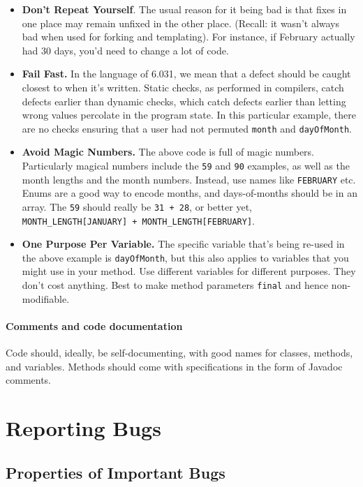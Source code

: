 \documentclass[11pt]{article}
\begin{document}
\begin{itemize}
\item {\bf Don't Repeat Yourself}. The usual reason for it
  being bad is that fixes in one place may remain unfixed in the other place. (Recall: it wasn't
  always bad when used for forking and templating). For instance, if February actually had 30
  days, you'd need to change a lot of code.
\item {\bf Fail Fast.} In the language of 6.031, we mean that a defect should be caught
  closest to when it's written. Static checks, as performed in compilers, catch defects
  earlier than dynamic checks, which catch defects earlier than letting wrong values percolate
  in the program state. In this particular example, there are no checks ensuring that a
  user had not permuted {\tt month} and {\tt dayOfMonth}.
\item {\bf Avoid Magic Numbers.} The above code is full of magic numbers. Particularly
  magical numbers include the {\tt 59} and {\tt 90} examples, as well as the month lengths
  and the month numbers. Instead, use names like {\tt FEBRUARY} etc. Enums are a good way
  to encode months, and days-of-months should be in an array. The {\tt 59} should really be
  {\tt 31 + 28}, or better yet, \verb!MONTH_LENGTH[JANUARY] + MONTH_LENGTH[FEBRUARY]!.
\item {\bf One Purpose Per Variable.} The specific variable that's
  being re-used in the above example is {\tt dayOfMonth}, but this
  also applies to variables that you might use in your method. Use
  different variables for different purposes. They don't cost
  anything. Best to make method parameters {\tt final} and hence
  non-modifiable.
\end{itemize}

\paragraph{Comments and code documentation}
Code should, ideally, be self-documenting, with good names for
classes, methods, and variables. Methods should come with
specifications in the form of Javadoc comments.

\section*{Reporting Bugs}

\subsection*{Properties of Important Bugs}
\end{document}
